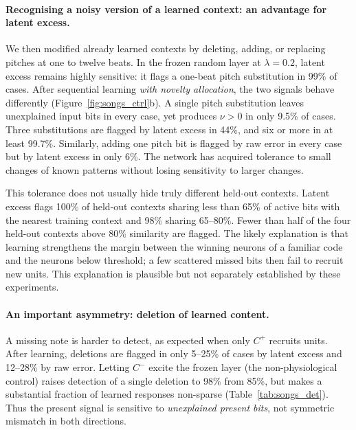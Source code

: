 \documentclass[11pt,a4paper]{article}
\begin{document}
\paragraph{Recognising a noisy version of a learned context: an advantage for latent excess.}
We then modified already learned contexts by deleting, adding, or replacing pitches at one to twelve beats. In the frozen random layer at $\lambda=0.2$, latent excess remains highly sensitive: it flags a one-beat pitch substitution in 99\% of cases. After sequential learning \emph{with novelty allocation}, the two signals behave differently (Figure~\ref{fig:songs_ctrl}b). A single pitch substitution leaves unexplained input bits in every case, yet produces $\nu>0$ in only 9.5\% of cases. Three substitutions are flagged by latent excess in 44\%, and six or more in at least 99.7\%. Similarly, adding one pitch bit is flagged by raw error in every case but by latent excess in only 6\%. The network has acquired tolerance to small changes of known patterns without losing sensitivity to larger changes.

This tolerance does not usually hide truly different held-out contexts. Latent excess flags 100\% of held-out contexts sharing less than 65\% of active bits with the nearest training context and 98\% sharing 65--80\%. Fewer than half of the four held-out contexts above 80\% similarity are flagged. The likely explanation is that learning strengthens the margin between the winning neurons of a familiar code and the neurons below threshold; a few scattered missed bits then fail to recruit new units. This explanation is plausible but not separately established by these experiments.

\paragraph{An important asymmetry: deletion of learned content.}
A missing note is harder to detect, as expected when only $C^+$ recruits units. After learning, deletions are flagged in only 5--25\% of cases by latent excess and 12--28\% by raw error. Letting $C^-$ excite the frozen layer (the non-physiological control) raises detection of a single deletion to 98\% from 85\%, but makes a substantial fraction of learned responses non-sparse (Table~\ref{tab:songs_det}). Thus the present signal is sensitive to \emph{unexplained present bits}, not symmetric mismatch in both directions.
\end{document}
